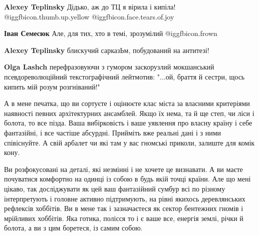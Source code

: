 \begin{itemize}
\begin{itemize}
\textbf{Alexey Teplinsky} Дідько, аж до ТЦ я вірила і кипіла!  @igg{fbicon.thumb.up.yellow}  @igg{fbicon.face.tears.of.joy} 

 
\textbf{Іван Семесюк} Але, для тих, хто в темі, зрозумілий  @igg{fbicon.frown} 

 
\textbf{Alexey Teplinsky} блискучий сарказЬм, побудований на антитезі!

 
\textbf{Olga Lashch} перефразовуючи з гумором заскорузлий мокшанський псевдореволюційний текстографічний лейтмотив: "...ой, браття й сестри, щось кипить мій розум розгніваний!"
\end{itemize} %

 

А в мене печатка, що ви сортуєте і оцінюєте клас міста за власними критеріями
наявності певних архітектурних ансамблей. Якщо їх нема, та й ще степ, чи ліси і
болота, то все пізда. Ваша вибірковість і ваше уявлення про власну країну і
себе фантазійні, і все частіше абсурдні. Прийміть вже реальні дані і з ними
співіснуйте. А свій арбалет чи які там у вас гномські приколи, залиште для
комік кону.

Ви розфокусовані на деталі, які незмінні і не хочете це визнавати. А ви маєте
почуватися комфортно на одинці із собою в будь якій точці країни. Але що мені
цікаво, так досліджувати як цей ваш фантазійний сумбур всі по різному
інтерпретують і головне активно підтримують, на рівні якихось деревлянських
рефлексів хоббітів. Ви в мене так і зазначаєтеся як сектор бентежних гномів і
мрійливих хоббітів. Яка готика, полісся то і є ваше все, енергія землі, річки й
болота, а ви з цим боретеся, із самим собою.



\end{itemize}

